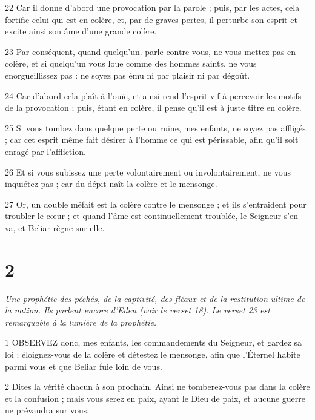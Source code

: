 \par 22 Car il donne d'abord une provocation par la parole ; puis, par les actes, cela fortifie celui qui est en colère, et, par de graves pertes, il perturbe son esprit et excite ainsi son âme d'une grande colère.

\par 23 Par conséquent, quand quelqu'un. parle contre vous, ne vous mettez pas en colère, et si quelqu'un vous loue comme des hommes saints, ne vous enorgueillissez pas : ne soyez pas ému ni par plaisir ni par dégoût.

\par 24 Car d'abord cela plaît à l'ouïe, et ainsi rend l'esprit vif à percevoir les motifs de la provocation ; puis, étant en colère, il pense qu'il est à juste titre en colère.

\par 25 Si vous tombez dans quelque perte ou ruine, mes enfants, ne soyez pas affligés ; car cet esprit même fait désirer à l'homme ce qui est périssable, afin qu'il soit enragé par l'affliction.

\par 26 Et si vous subissez une perte volontairement ou involontairement, ne vous inquiétez pas ; car du dépit naît la colère et le mensonge.

\par 27 Or, un double méfait est la colère contre le mensonge ; et ils s'entraident pour troubler le cœur ; et quand l'âme est continuellement troublée, le Seigneur s'en va, et Beliar règne sur elle.



\chapter{2}

\par \textit{Une prophétie des péchés, de la captivité, des fléaux et de la restitution ultime de la nation. Ils parlent encore d'Eden (voir le verset 18). Le verset 23 est remarquable à la lumière de la prophétie.}

\par 1 OBSERVEZ donc, mes enfants, les commandements du Seigneur, et gardez sa loi ; éloignez-vous de la colère et détestez le mensonge, afin que l'Éternel habite parmi vous et que Beliar fuie loin de vous.

\par 2 Dites la vérité chacun à son prochain. Ainsi ne tomberez-vous pas dans la colère et la confusion ; mais vous serez en paix, ayant le Dieu de paix, et aucune guerre ne prévaudra sur vous.

